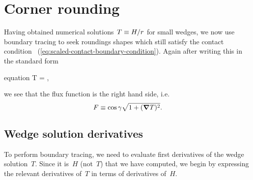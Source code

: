 \begin{figure}
\end{figure}

\section{Corner rounding}
\label{sec:small.rounding}

Having obtained numerical solutions~$T \equiv H / r$ for small wedges,
we now use boundary tracing to seek roundings shapes
which still satisfy the contact condition~%
  (\ref{eq:scaled-contact-boundary-condition}).
Again after writing this in the standard form
\begin{important}{equation}
  \normalvec \dotp \del T = \cos\gamma {},
  \label{eq:small-flux-boundary-condition}
\end{important}
we see that the flux function is the right hand side, i.e.
\begin{equation}
  F \equiv \cos\gamma \sqrt{1 + (\mathop{}\!\boldsymbol{\mathbf{\nabla}} T)^2}.
  \label{eq:small-flux-function}
\end{equation}

\subsection{Wedge solution derivatives}
\label{sec:small.rounding.derivatives}

To perform boundary tracing,
we need to evaluate first derivatives of the wedge solution~$T$.
Since it is~$H$ (not~$T$) that we have computed,
we begin by expressing the relevant derivatives of~$T$
in terms of derivatives of~$H$.


